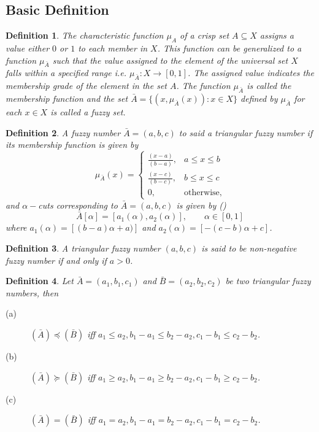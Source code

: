 \documentclass{iaesarticle3}
\newtheorem{definition}{Definition}
\begin{document}
\subsection{Basic Definition}
\begin{definition}
    \emph{\cite{kau}} The characteristic function $\mu_{A}$ of a crisp set $A \subseteq X$ assigns a value either $0$ or $1$ to each member in $X$. This function can be generalized to a function $\mu_{\bar{A}}$ such that the value assigned to the element of the universal set $X$ falls within a specified range i.e. $\mu_{\bar{A}}\colon X \to [0,1]$. The assigned value indicates the membership grade of the element in the set $A$. The function $\mu_{\bar{A}}$ is called the membership function and the set $\bar{A} = \{(x, \mu_{\bar{A}}(x))\colon x \in X \}$ defined by $\mu_{\bar{A}}$ for each $x \in X$ is called a fuzzy set.
\end{definition}
\begin{definition}
    \emph{\cite{lio}} A fuzzy number $\bar{A} = (a,b,c)$ to said a triangular fuzzy number if its membership function is given by
    \begin{displaymath}
        \mu_{\bar{A}}(x) =
        \left \{ \begin{array}{ll}
            \frac{(x-a)}{(b-a)},& a\leq x\leq b \\
            \frac{(x-c)}{(b-c)}, & b\leq x \leq c\\
            0, & \textrm{otherwise},
        \end{array} \right.
    \end{displaymath}
    and $\alpha-$cuts corresponding to $\bar{A} = (a, b, c)$ is given by \emph{(\cite{jam})}
    \begin{displaymath}
        \bar{A}[\alpha] = [a_1(\alpha), a_2(\alpha)], \qquad \alpha \in [0,1]
    \end{displaymath} where $a_1(\alpha) = [(b-a)\alpha +a)]$ and $a_2(\alpha) = [-(c-b)\alpha+ c]$.
\end{definition}

\begin{definition}
    \emph{\cite{lio}} A triangular fuzzy number $(a, b, c)$ is said to be non-negative fuzzy number if and only if $a > 0$.
\end{definition}

\begin{definition}
    Let $\bar{A} = (a_1, b_1, c_1)$ and $\bar{B} = (a_2, b_2, c_2)$ be two triangular fuzzy numbers, then
    \begin{description}
        \item[(a)] $(\bar{A}) \preceq (\bar{B})$ iff $a_1 \leq a_2, b_1 - a_1 \leq b_2 - a_2, c_1 - b_1 \leq c_2 - b_2$.
        \item[(b)] $(\bar{A}) \succeq (\bar{B})$ iff $a_1 \geq a_2, b_1 - a_1 \geq b_2 - a_2, c_1 - b_1 \geq c_2 - b_2$.
        \item[(c)] $(\bar{A}) = (\bar{B})$ iff $a_1 = a_2, b_1 - a_1 = b_2 - a_2, c_1 - b_1 = c_2 - b_2$.
    \end{description}
\end{definition}
\end{document}
